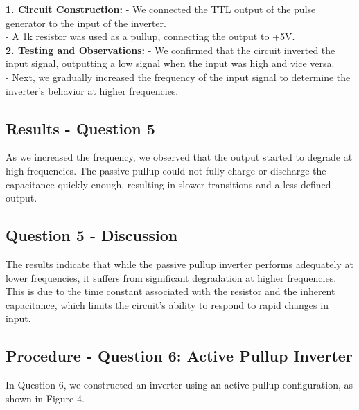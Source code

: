 \documentclass{article}
\begin{document}
    \textbf{1. Circuit Construction:}
       - We connected the TTL output of the pulse generator to the input of the inverter.
       \\
       - A 1k resistor was used as a pullup, connecting the output to +5V.
       \\

    \textbf{2. Testing and Observations:}
       - We confirmed that the circuit inverted the input signal, outputting a low signal when the input was high and vice versa.
       \\
       - Next, we gradually increased the frequency of the input signal to determine the inverter’s behavior at higher frequencies.
       \\

    \subsection*{\textbf{Results - Question 5}}
    As we increased the frequency, we observed that the output started to degrade at high frequencies. The passive pullup could not fully charge or discharge the capacitance quickly enough, resulting in slower transitions and a less defined output.

    \subsection*{\textbf{Question 5 - Discussion}}
    The results indicate that while the passive pullup inverter performs adequately at lower frequencies, it suffers from significant degradation at higher frequencies. This is due to the time constant associated with the resistor and the inherent capacitance, which limits the circuit’s ability to respond to rapid changes in input.

    \subsection*{\textbf{Procedure - Question 6: Active Pullup Inverter}}
    In Question 6, we constructed an inverter using an active pullup configuration, as shown in Figure 4.
\end{document}
